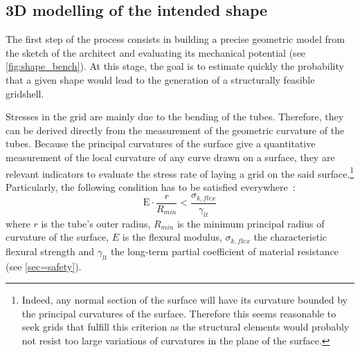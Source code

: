 \subsection{3D modelling of the intended shape}



The first step of the process consists in building a precise geometric model from the sketch of the architect and evaluating its mechanical potential (see \cref{fig:shape_bench}). At this stage, the goal is to estimate quickly the probability that a given shape would lead to the generation of a structurally feasible gridshell.

Stresses in the grid are mainly due to the bending of the tubes. Therefore, they can be derived directly from the measurement of the geometric curvature of the tubes. Because the principal curvatures of the surface give a quantitative measurement of the local curvature of any curve drawn on a surface, they are relevant indicators to evaluate the stress rate of laying a grid on the said surface.\footnote{Indeed, any normal section of the surface will have its curvature bounded by the principal curvatures of the surface. Therefore this seems reasonable to seek grids that fulfill this criterion as the structural elements would probably not resist too large variations of curvatures in the plane of the surface.} Particularly, the following condition has to be satisfied everywhere~:
\begin{equation}
	\mathrm{E} \cdot \frac{r}{R_{min}} < \frac{\sigma_{k,flex}}{\gamma_{lt}}
	\label{eq:crit_1}
\end{equation}
where $r$ is the tube’s outer radius, $R_{min}$ is the minimum principal radius of curvature of the surface, $E$ is the flexural modulus, $\sigma_{k,flex}$ the characteristic flexural strength and $\gamma_{lt}$ the long-term partial coefficient of material resistance (see \cref{sec=safety}).


